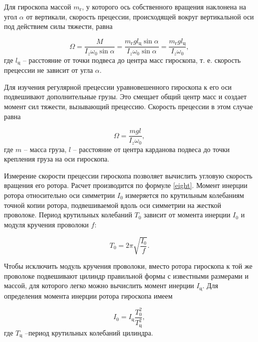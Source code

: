 \documentclass[a4paper, 12pt]{article}%
\begin{document}
	Для гироскопа массой $ m_\text{г} $, у которого ось собственного вращения наклонена на угол $ \alpha $ от вертикали, скорость прецессии, происходящей вокруг вертикальной оси под действием силы тяжести, равна
	
	\begin{equation}
		\Omega = \frac{M}{I_z\omega_0\sin \alpha} = \frac{m_\text{г}gl_\text{ц}\sin\alpha}{I_z\omega_0\sin\alpha} = \frac{m_\text{г}gl_\text{ц}}{I_z\omega_0},
	\end{equation}
	где $ l_\text{ц} $ -- расстояние от точки подвеса до центра масс гироскопа, т. е. скорость прецессии не зависит от угла $ \alpha $.
	
	Для изучения регулярной прецессии уравновешенного гироскопа к его оси подвешивают дополнительные грузы. Это смещает общий центр масс и создает момент сил тяжести, вызывающий прецессию. Скорость прецессии в этом случае равна
	
	\begin{equation}
		\Omega = \frac{mgl}{I_z\omega_0},
		\label{eight}
	\end{equation}
	где $ m $ -- масса груза, $ l $ -- расстояние от центра карданова подвеса до точки крепления груза на оси гироскопа.
	
	Измерение скорости прецессии гироскопа позволяет вычислить угловую скорость вращения его ротора. Расчет производится по формуле \eqref{eight}. Момент инерции ротора относительно оси симметрии $ I_0 $ измеряется по крутильным колебаниям точной копии ротора, подвешиваемой вдоль оси симметрии на жесткой проволоке. Период крутильных колебаний $ T_0 $ зависит от момента инерции $ I_0 $ и модуля кручения проволоки $ f $:
	
	\begin{equation}
		T_0 = 2\pi\sqrt{\frac{I_0}{f}}.
		\label{nine}
	\end{equation} 
	
	Чтобы исключить модуль кручения проволоки, вместо ротора гироскопа к той же проволоке подвешивают цилиндр правильной формы с известными размерами и массой, для которого легко можно вычислить момент инерции $ I_\text{ц} $. Для определения момента инерции ротора гироскопа имеем 
	
	\begin{equation}
		I_0=I_\text{ц}\frac{T_0^2}{T_\text{ц}^2},
		\label{ten}
	\end{equation}
	где $ T_\text{ц} $ --период крутильных колебаний цилиндра.
	
	\newpage
	
\end{document}
